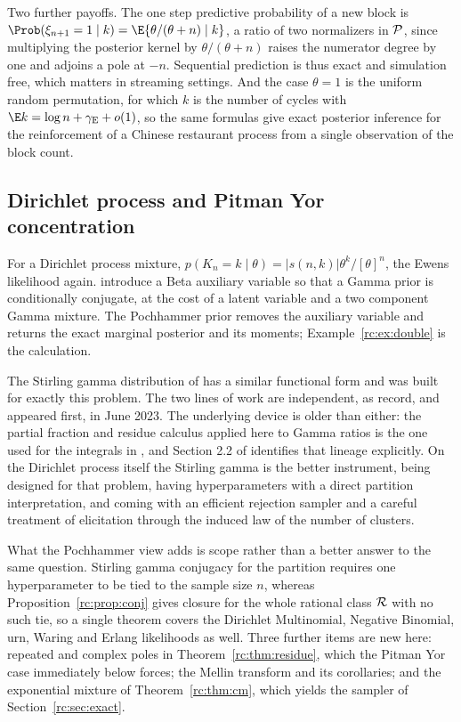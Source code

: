 Two further payoffs. The one step predictive probability of a new block is $\Prob(\xi_{n+1}=1\mid k)=\E\{\theta/(\theta+n)\mid k\}$, a ratio of two normalizers in $\mathcal{P}$, since multiplying the posterior kernel by $\theta/(\theta+n)$ raises the numerator degree by one and adjoins a pole at $-n$. Sequential prediction is thus exact and simulation free, which matters in streaming settings. And the case $\theta=1$ is the uniform random permutation, for which $k$ is the number of cycles with $\E k=\log n+\rcgE+o(1)$, so the same formulas give exact posterior inference for the reinforcement of a Chinese restaurant process from a single observation of the block count.

\subsection{Dirichlet process and Pitman Yor concentration}\label{rc:sec:py}

For a Dirichlet process mixture, $p(K_n=k\mid\theta)=|s(n,k)|\theta^k/[\theta]^n$, the Ewens likelihood again. \citet{rc:escobar1995} introduce a Beta auxiliary variable so that a Gamma prior is conditionally conjugate, at the cost of a latent variable and a two component Gamma mixture. The Pochhammer prior removes the auxiliary variable and returns the exact marginal posterior and its moments; Example~\ref{rc:ex:double} is the calculation.

The Stirling gamma distribution of \citet{rc:zito2024} has a similar functional form and was built for exactly this problem. The two lines of work are independent, as \citet{rc:wang2024} record, and \citet{rc:zito2024} appeared first, in June 2023. The underlying device is older than either: the partial fraction and residue calculus applied here to Gamma ratios is the one used for the integrals in \citet{rc:polson2013}, and Section 2.2 of \citet{rc:wang2024} identifies that lineage explicitly. On the Dirichlet process itself the Stirling gamma is the better instrument, being designed for that problem, having hyperparameters with a direct partition interpretation, and coming with an efficient rejection sampler and a careful treatment of elicitation through the induced law of the number of clusters.

What the Pochhammer view adds is scope rather than a better answer to the same question. Stirling gamma conjugacy for the partition requires one hyperparameter to be tied to the sample size $n$, whereas Proposition~\ref{rc:prop:conj} gives closure for the whole rational class $\mathcal{R}$ with no such tie, so a single theorem covers the Dirichlet Multinomial, Negative Binomial, urn, Waring and Erlang likelihoods as well. Three further items are new here: repeated and complex poles in Theorem~\ref{rc:thm:residue}, which the Pitman Yor case immediately below forces; the Mellin transform and its corollaries; and the exponential mixture of Theorem~\ref{rc:thm:cm}, which yields the sampler of Section~\ref{rc:sec:exact}.

